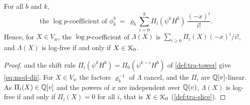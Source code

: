 \begin{prop}
\label{prop:mod-dii}
For all $b$ and $k$,
\begin{equation}
\label{eq:mod-dii}
\text{the }\log p\text{-coefficient of }\phi^b_k\ =\ \varrho_b\sum_{i=0}^k\Pi_i(\psi^kH^b)\,\frac{(-x)^i}{i!}.
\end{equation}
Hence, for $X\in V_w$, the $\log p$-coefficient of $\Lambda(X)$ is $\sum_{i\geq 0}\Pi_i(X)(-x)^i/i!$, and $\Lambda(X)$ is log-free if and only if $X\in\mathcal{K}_{0}$.
\end{prop}

\begin{proof}
 and the shift rule $\Pi_i(\psi^kH^b)=\Pi_0(\psi^{k-i}H^b)$ of \cref{def:tra-tower} give \eqref{eq:mod-dii}. For $X\in V_w$ the factors $\varrho_b^{-1}$ of $\Lambda$ cancel, and the $\Pi_i$ are $\mathbb{Q}[v]$-linear. As $\Pi_i(X)\in\mathbb{Q}[v]$ and the powers of $x$ are independent over $\mathbb{Q}(v)$, $\Lambda(X)$ is log-free if and only if $\Pi_i(X)=0$ for all $i$, that is $X\in\mathcal{K}_{0}$ (\cref{def:tra-slice}).
\end{proof}


